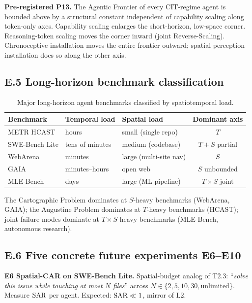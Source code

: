 \textbf{Pre-registered P13.} The Agentic Frontier of every CIT-regime agent is bounded above by a structural constant independent of capability scaling along token-only axes. Capability scaling enlarges the short-horizon, low-space corner. Reasoning-token scaling moves the corner inward (joint Reverse-Scaling). Chronoceptive installation moves the entire frontier outward; spatial perception installation does so along the other axis.

\subsection*{E.5 Long-horizon benchmark classification}

\begin{table}[h]
\centering
\caption{Major long-horizon agent benchmarks classified by spatiotemporal load.}
\label{tab:benchmark-st-load}
\small
\begin{tabular}{lllc}
\toprule
Benchmark & Temporal load & Spatial load & Dominant axis \\
\midrule
METR HCAST \citep{kwa2025metrhorizons} & hours & small (single repo) & $T$ \\
SWE-Bench Lite \citep{swebench} & tens of minutes & medium (codebase) & $T + S$ partial \\
WebArena \citep{webarena} & minutes & large (multi-site nav) & $S$ \\
GAIA \citep{gaia} & minutes--hours & open web & $S$ unbounded \\
MLE-Bench & days & large (ML pipeline) & $T \times S$ joint \\
\bottomrule
\end{tabular}
\end{table}

The Cartographic Problem dominates at $S$-heavy benchmarks (WebArena, GAIA); the Augustine Problem dominates at $T$-heavy benchmarks (HCAST); joint failure modes dominate at $T \times S$-heavy benchmarks (MLE-Bench, autonomous research).

\subsection*{E.6 Five concrete future experiments E6--E10}

\textbf{E6 Spatial-CAR on SWE-Bench Lite.} Spatial-budget analog of T2.3: ``\textit{solve this issue while touching at most $N$ files}'' across $N \in \{2, 5, 10, 30, \text{unlimited}\}$. Measure $\mathrm{SAR}$ per agent. Expected: $\mathrm{SAR} \ll 1$, mirror of L2.


